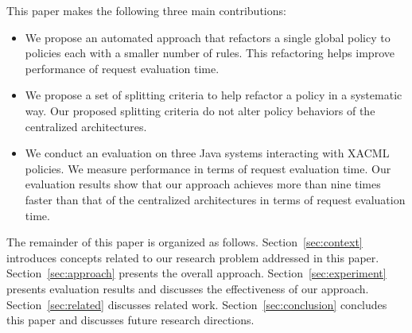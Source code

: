 This paper makes the following three main contributions:
\begin{itemize}
\item We propose an automated approach that refactors a single global policy to policies each with a smaller number of rules. This
refactoring helps improve performance of request evaluation time.
\item We propose a set of splitting criteria to help refactor a policy in a systematic way. Our proposed splitting criteria do not alter policy behaviors of the centralized architectures.
\item We conduct an evaluation on three Java systems interacting with XACML policies. We measure performance in terms
of request evaluation time.
Our evaluation results show that our approach achieves more than nine times faster than that of the centralized architectures in terms of request evaluation time.
\end{itemize}


The remainder of this paper is organized as follows. Section~\ref{sec:context} introduces concepts related to our research problem addressed in this paper.
Section~\ref{sec:approach} presents the overall approach.
Section~\ref{sec:experiment} presents evaluation results and discusses the effectiveness of our approach. Section~\ref{sec:related} discusses related work.
Section~\ref{sec:conclusion} concludes this paper and discusses future research directions.

